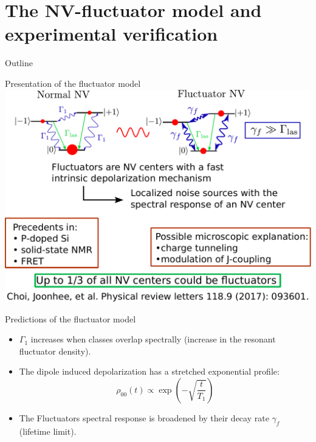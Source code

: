 \documentclass{beamer}
\begin{document}
\section{The NV-fluctuator model and experimental verification}
\begin{frame}{Outline}
\tableofcontents[currentsection]
\end{frame}
\begin{frame}{Presentation of the fluctuator model}
\centering
\includegraphics[width=\textwidth,height=0.8\textheight,keepaspectratio]{Slide_fluct_intro}
\end{frame}

\begin{frame}{Predictions of the fluctuator model}
\begin{itemize}
\item $\Gamma_1$ increases when classes overlap spectrally (increase in the resonant fluctuator density).
\item The dipole induced depolarization has a stretched exponential profile:
$$ \rho_{00}(t) \propto \exp(-\sqrt{\frac{t}{T_1}})$$
\item The Fluctuators spectral response is broadened by their decay rate $\gamma_f$ (lifetime limit).
\end{itemize}
\end{frame}
\end{document}
